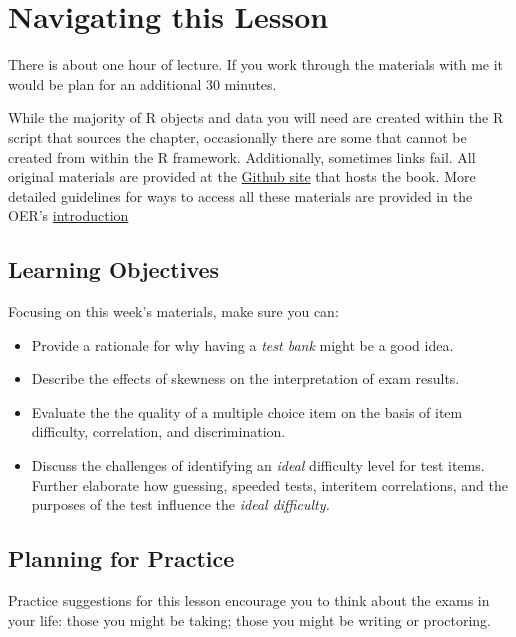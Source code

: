 \documentclass[
  english,
]{book}
\providecommand{\tightlist}{%
  \setlength{\itemsep}{0pt}\setlength{\parskip}{0pt}}
\begin{document}
\hypertarget{navigating-this-lesson-4}{%
\section{Navigating this Lesson}\label{navigating-this-lesson-4}}

There is about one hour of lecture. If you work through the materials with me it would be plan for an additional 30 minutes.

While the majority of R objects and data you will need are created within the R script that sources the chapter, occasionally there are some that cannot be created from within the R framework. Additionally, sometimes links fail. All original materials are provided at the \href{https://github.com/lhbikos/ReC_Psychometrics}{Github site} that hosts the book. More detailed guidelines for ways to access all these materials are provided in the OER's \protect\hyperlink{ReCintro}{introduction}

\hypertarget{learning-objectives-4}{%
\subsection{Learning Objectives}\label{learning-objectives-4}}

Focusing on this week's materials, make sure you can:

\begin{itemize}
\tightlist
\item
  Provide a rationale for why having a \emph{test bank} might be a good idea.
\item
  Describe the effects of skewness on the interpretation of exam results.
\item
  Evaluate the the quality of a multiple choice item on the basis of item difficulty, correlation, and discrimination.
\item
  Discuss the challenges of identifying an \emph{ideal} difficulty level for test items. Further elaborate how guessing, speeded tests, interitem correlations, and the purposes of the test influence the \emph{ideal difficulty.}
\end{itemize}

\hypertarget{planning-for-practice-4}{%
\subsection{Planning for Practice}\label{planning-for-practice-4}}

Practice suggestions for this lesson encourage you to think about the exams in your life: those you might be taking; those you might be writing or proctoring.
\end{document}
